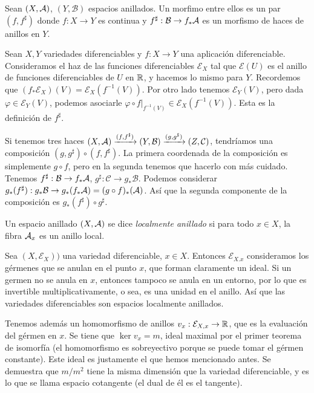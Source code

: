 \documentclass[GA.tex]{subfiles}
\begin{document}
 \begin{defi}
 Sean $(X,\mathcal{A})$, $(Y,\mathcal{B})$ espacios anillados. Un morfimo entre ellos es un par $(f, f^{\sharp})$ donde $f:X\to Y$ es continua y $f^{\sharp}:\mathcal{B}\to f_*\mathcal{A}$ es un morfismo de haces de anillos en $Y$. 
 
\end{defi} 


\begin{ej}
Sean $X,Y$ variedades diferenciables y $f:X\to Y$ una aplicación diferenciable. Consideramos el haz de las funciones diferenciables $\mathcal{E}_X$ tal que $\mathcal{E}(U)$ es el anillo de funciones diferenciables de $U$ en $\mathbb{R}$, y hacemos lo mismo para $Y$. Recordemos que $(f_*\mathcal{E}_X)(V)=\mathcal{E}_X(f^{-1}(V))$. Por otro lado tenemos $\mathcal{E}_Y(V)$, pero dada $\varphi\in \mathcal{E}_Y(V)$, podemos asociarle $\varphi\circ f|_{f^{-1}(V)}\in\mathcal{E}_X(f^{-1}(V))$. Esta es la definición de $f^{\sharp}$. 
\end{ej}

Si tenemos tres haces $(X,\mathcal{A})\xrightarrow{(f,f^{\sharp})}(Y,\mathcal{B})\xrightarrow{(g,g^{\sharp})}(Z,\mathcal{C})$, tendríamos una composición $(g,g^{\sharp})\circ(f, f^{\sharp})$. La primera coordenada de la composición es simplemente $g\circ f$, pero en la segunda tenemos que hacerlo con más cuidado. Tenemos $f^{\sharp}:\mathcal{B}\to f_*\mathcal{A}$, $g^{\sharp}:\mathcal{C}\to g_*\mathcal{B}$. Podemos considerar $g_*(f^{\sharp}):g_*\mathcal{B}\to g_*(f_*\mathcal{A})=(g\circ f)_*(\mathcal{A})$. Así que la segunda componente de la composición es $g_*(f^\sharp)\circ g^{\sharp}$. 



\begin{defi}
Un espacio anillado $(X,\mathcal{A})$ se dice \emph{localmente anillado} si para todo $x\in X$, la fibra $\mathcal{A}_x$ es un anillo local.
\end{defi}


\begin{ej}
Sea $(X,\mathcal{E}_X))$ una variedad diferenciable, $x\in X$. Entonces $\mathcal{E}_{X.x}$ consideramos los gérmenes que se anulan en el punto $x$, que forman claramente un ideal. Si un germen no se anula en $x$, entonces tampoco se anula en un entorno, por lo que es invertible multiplicativamente, o sea, es una unidad en el anillo. Así que las variedades diferenciables son espacios localmente anillados.

Tenemos además un homomorfismo de anillos $v_x:\mathcal{E}_{X,x}\to \mathbb{R}$, que es la evaluación del gérmen en $x$. Se tiene que $\ker v_x=m$, ideal maximal por el primer teorema de isomorfía (el homomorfismo es sobreyectivo porque se puede tomar el gérmen constante). Este ideal es justamente el que hemos mencionado antes. Se demuestra que $m/m^2$ tiene la misma dimensión que la variedad diferenciable, y es lo que se llama espacio cotangente (el dual de él es el tangente). 
\end{ej}
\end{document}
